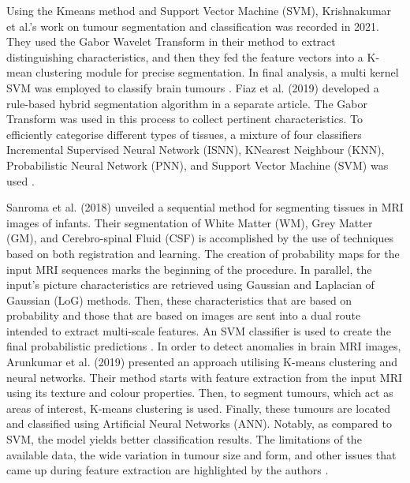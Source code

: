 \documentclass[12pt, a4paper,twoside]{report}
\theoremstyle{plain} %
\theoremstyle{definition} %
\theoremstyle{remark} %
\numberwithin{equation}{chapter}
\begin{document}
Using the K\-means method and Support Vector Machine (SVM), Krishnakumar et al.'s work on tumour segmentation and classification was recorded in 2021. They used the Gabor Wavelet Transform in their method to extract distinguishing characteristics, and then they fed the feature vectors into a K-mean clustering module for precise segmentation. In final analysis, a multi kernel SVM was employed to classify brain tumours \cite{krishnakumar2021effective}. Fiaz et al. (2019) developed a rule-based hybrid segmentation algorithm in a separate article. The Gabor Transform was used in this process to collect pertinent characteristics. To efficiently categorise different types of tissues, a mixture of four classifiers Incremental Supervised Neural Network (ISNN), K\-Nearest Neighbour (KNN), Probabilistic Neural Network (PNN), and Support Vector Machine (SVM) was used \cite{fiaz2019brain}.

Sanroma et al. (2018) unveiled a sequential method for segmenting tissues in MRI images of infants. Their segmentation of White Matter (WM), Grey Matter (GM), and Cerebro-spinal Fluid (CSF) is accomplished by the use of techniques based on both registration and learning. The creation of probability maps for the input MRI sequences marks the beginning of the procedure. In parallel, the input's picture characteristics are retrieved using Gaussian and Laplacian of Gaussian (LoG) methods. Then, these characteristics that are based on probability and those that are based on images are sent into a dual route intended to extract multi-scale features. An SVM classifier is used to create the final probabilistic predictions \cite{sanroma2018learning}. In order to detect anomalies in brain MRI images, Arunkumar et al. (2019) presented an approach utilising K-means clustering and neural networks. Their method starts with feature extraction from the input MRI using its texture and colour properties. Then, to segment tumours, which act as areas of interest, K-means clustering is used. Finally, these tumours are located and classified using Artificial Neural Networks (ANN). Notably, as compared to SVM, the model yields better classification results. The limitations of the available data, the wide variation in tumour size and form, and other issues that came up during feature extraction are highlighted by the authors \cite{arunkumar2019k}.
\end{document}
